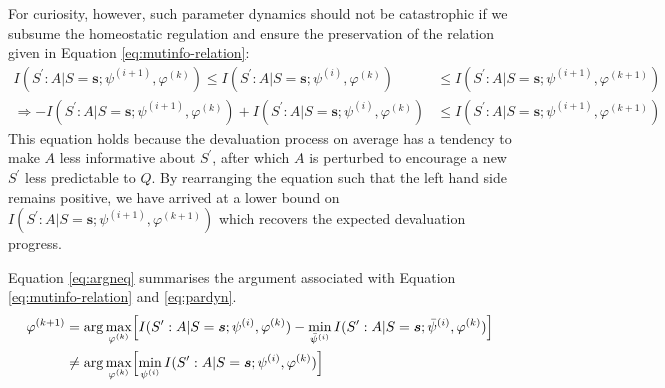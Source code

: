 \documentclass[utf8]{frontiersSCNS}
\newcommand{\bs}{\boldsymbol}
\newcommand{\argmax}{\arg\max}
\begin{document}
For curiosity, however, such parameter dynamics should not be catastrophic if we subsume the homeostatic regulation and ensure the preservation of the relation given in Equation \ref{eq:mutinfo-relation}:
%
	\begin{equation}
	\begin{aligned} \label{eq:mutinfo-relation}
	I(S^\prime : A | S=\bs{s}; \psi^{(i+1)}, \varphi^{(k)}) \le
		I(S^\prime : A | S=\bs{s}; \psi^{(i)}, \varphi^{(k)}) &\le
		I(S^\prime : A | S=\bs{s}; \psi^{(i+1)}, \varphi^{(k+1)}) \\
	\Rightarrow
		-I(S^\prime : A | S=\bs{s}; \psi^{(i+1)}, \varphi^{(k)}) + 
		 I(S^\prime : A | S=\bs{s}; \psi^{(i)}, \varphi^{(k)}) &\le
		 I(S^\prime : A | S=\bs{s}; \psi^{(i+1)}, \varphi^{(k+1)})
	\end{aligned}
	\end{equation}
%
This equation holds because the devaluation process on average has a tendency to make $A$ less informative about $S^\prime$, after which $A$ is perturbed to encourage a new $S^\prime$ less predictable to $Q$. By rearranging the equation such that the left hand side remains positive, we have arrived at a lower bound on $I(S^\prime : A | S=\bs{s}; \psi^{(i+1)}, \varphi^{(k+1)})$ which recovers the expected devaluation progress.

Equation \ref{eq:argneq} summarises the argument associated with Equation \ref{eq:mutinfo-relation} and \ref{eq:pardyn}. 
%
	\begin{equation}
	\begin{aligned} \label{eq:argneq}
	\varphi^{(k+1)} 
	&= 
	\argmax_{\varphi^{(k)}} 
	\Bigl[
	I(S^\prime : A|S=\bs{s}; \psi^{(i)}, \varphi^{(k)}) -
	\min_{\bar{\psi}^{(i)}} I(S^\prime : A|S=\bs{s}; \bar{\psi}^{(i)}, \varphi^{(k)})
	\Bigr] \\
	&\neq
	\argmax_{\varphi^{(k)}} 
	\Bigl[
	\min_{\psi^{(i)}} I(S^\prime : A|S=\bs{s}; \psi^{(i)}, \varphi^{(k)})
	\Bigr]
	\end{aligned}
	\end{equation}
\end{document}
